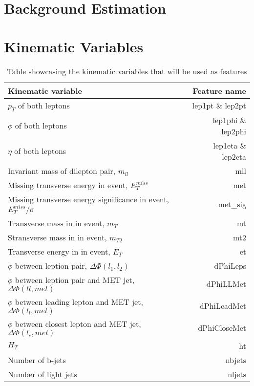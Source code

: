 \documentclass[14pt, a4paper]{book}
\begin{document}
\section{Background Estimation}
\section{Kinematic Variables}
\begin{table}[!h]
    \centering
    \begin{tabular}{l|r}\midrule\midrule
        Kinematic variable                                                  & Feature name          \\\midrule
        $p_T$ of both leptons                                               & lep1pt \& lep2pt      \\
        $\phi$ of both leptons                                              & lep1phi \& lep2phi    \\
        $\eta$ of both leptons                                              & lep1eta \& lep2eta    \\
        Invariant mass of dilepton pair, $m_{ll}$                           & mll \\
        Missing transverse energy in event, $E_T^{miss}$                    & met \\
        Missing transverse energy significance in event, $E_T^{miss}/\sigma$& met\_sig \\
        Transverse mass in in event, $m_T$                                  & mt \\
        Stransverse mass in in event, $m_{T2}$                              & mt2\\
        Transverse energy in in event, $E_T$                                & et \\
        $\phi$ between leption pair, $\Delta\Phi(l_1,l_2)$                  & dPhiLeps \\
        $\phi$ between leption pair and MET jet, $\Delta\Phi(ll,met)$       & dPhiLLMet \\
        $\phi$ between leading lepton and MET jet, $\Delta\Phi(l_l,met)$    & dPhiLeadMet \\
        $\phi$ between closest lepton and MET jet, $\Delta\Phi(l_c,met)$    & dPhiCloseMet \\
        $H_T$                                                               & ht\\
        Number of b-jets                                                    & nbjets         \\
        Number of light jets                                                & nljets         \\\midrule\midrule
    \end{tabular}
    \caption[Kinematic variables used as features]{Table showcasing the kinematic variables that will be used as features}
    \label{tab:variables}
\end{table}
\end{document}
